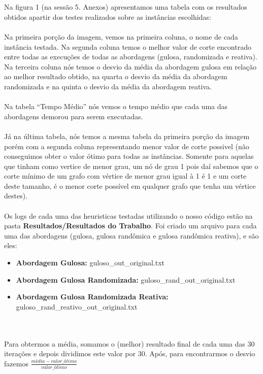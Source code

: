 \documentclass[a4paper, 12pt]{article}
\begin{document}
\\ \\ \indent Na figura 1 (na sessão 5. Anexos) apresentamos uma tabela com os resultados obtidos apartir dos testes realizados sobre as instâncias escolhidas:
\\ \\ \ident Na primeira porção da imagem, vemos na primeira coluna, o nome de cada instância testada. Na segunda coluna temos o melhor valor de corte encontrado entre todas as execuções de todas as abordagens (gulosa, randomizada e reativa). Na terceira coluna nós temos o desvio da média da abordagem gulosa em relação ao melhor resultado obtido{\tiny*}, na quarta o desvio da média da abordagem randomizada e na quinta o desvio da média da abordagem reativa{\tiny*}.
\\ \\ \indent Na tabela ``Tempo Médio'' nós vemos o tempo médio que cada uma das abordagens demorou para serem executadas.
\\ \\ \indent Já na última tabela, nós temos a mesma tabela da primeira porção da imagem porém com a segunda coluna representando menor valor de corte possivel (não conseguimos obter o valor ótimo para todas as instâncias. Somente para aquelas que tinham como vertice de menor grau, um nó de grau 1 pois daí sabemos que o corte mínimo de um grafo com vértice de menor grau igual à 1 é 1 e um corte deste tamanho, é o menor corte possível em qualquer grafo que tenha um vértice destes).
\\ \\ \indent Os logs de cada uma das heuristicas testadas utilizando o nosso código estão na pasta \textbf{Resultados/Resultados do Trabalho}. Foi criado um arquivo para cada uma das abordagens (gulosa, gulosa randômica e gulosa randômica reativa), e são eles:
\begin{itemize}
  \item \textbf{Abordagem Gulosa:} guloso\_out\_original.txt
  \item \textbf{Abordagem Gulosa Randomizada:} guloso\_rand\_out\_original.txt
  \item \textbf{Abordagem Gulosa Randomizada Reativa:} guloso\_rand\_reativo\_out\_original.txt
\end{itemize}
\\ \\ {\tiny * Para obtermos a média, somamos o (melhor) resultado final de cada uma das 30 iterações e depois dividimos este valor por 30. Após, para encontrarmos o desvio fazemos  \( \frac{média - valor\_ótimo}{valor\_ótimo} \)}
\end{document}
